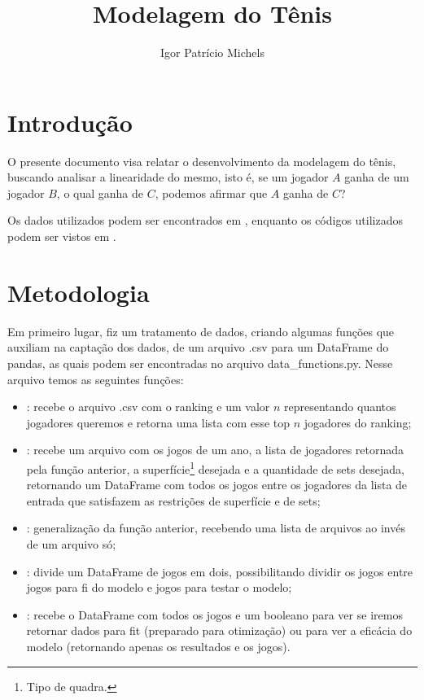 \documentclass{article}
\title{Modelagem do Tênis}
\author{Igor Patrício Michels}
\begin{document}
\maketitle

\section{Introdução}

O presente documento visa relatar o desenvolvimento da modelagem do tênis, buscando analisar a linearidade do mesmo, isto é, se um jogador $A$ ganha de um jogador $B$, o qual ganha de $C$, podemos afirmar que $A$ ganha de $C$?

Os dados utilizados podem ser encontrados em \cite{github}, enquanto os códigos utilizados podem ser vistos em \cite{github2}.

\section{Metodologia}

Em primeiro lugar, fiz um tratamento de dados, criando algumas funções que auxiliam na captação dos dados, de um arquivo {\selectfont .csv} para um DataFrame do pandas, as quais podem ser encontradas no arquivo {\selectfont data\_functions.py}. Nesse arquivo temos as seguintes funções:
\begin{itemize}
    \item
        : recebe o arquivo {\selectfont .csv} com o ranking e um valor $n$ representando quantos jogadores queremos e retorna uma lista com esse top $n$ jogadores do ranking;
        
    \item
        : recebe um arquivo com os jogos de um ano, a lista de jogadores retornada pela função anterior, a superfície\footnote{Tipo de quadra.} desejada e a quantidade de sets desejada, retornando um DataFrame com todos os jogos entre os jogadores da lista de entrada que satisfazem as restrições de superfície e de sets;
        
    \item
        : generalização da função anterior, recebendo uma lista de arquivos ao invés de um arquivo só;
        
    \item
        : divide um DataFrame de jogos em dois, possibilitando dividir os jogos entre jogos para fi do modelo e jogos para testar o modelo;
        
    \item
        : recebe o DataFrame com todos os jogos e um booleano para ver se iremos retornar dados para fit (preparado para otimização) ou para ver a eficácia do modelo (retornando apenas os resultados e os jogos).
\end{itemize}
\end{document}
